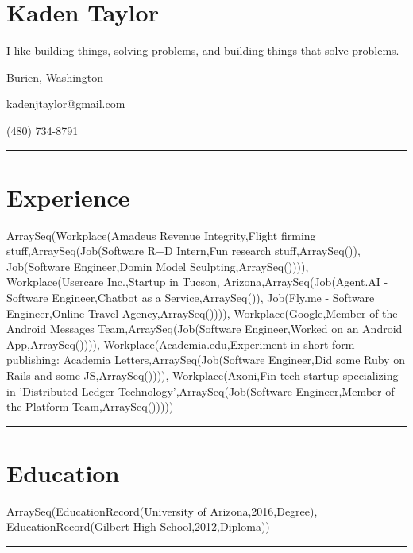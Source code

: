 \documentclass{article}
\begin{document}
\section*{Kaden Taylor}

I like building things, solving problems, and building things that solve problems.
\newline

Burien, Washington

kadenjtaylor@gmail.com

(480) 734-8791

\noindent\rule{\linewidth}{1pt}

\section*{Experience}

ArraySeq(Workplace(Amadeus Revenue Integrity,Flight firming stuff,ArraySeq(Job(Software R+D Intern,Fun research stuff,ArraySeq()), Job(Software Engineer,Domin Model Sculpting,ArraySeq()))), Workplace(Usercare Inc.,Startup in Tucson, Arizona,ArraySeq(Job(Agent.AI - Software Engineer,Chatbot as a Service,ArraySeq()), Job(Fly.me - Software Engineer,Online Travel Agency,ArraySeq()))), Workplace(Google,Member of the Android Messages Team,ArraySeq(Job(Software Engineer,Worked on an Android App,ArraySeq()))), Workplace(Academia.edu,Experiment in short-form publishing: Academia Letters,ArraySeq(Job(Software Engineer,Did some Ruby on Rails and some JS,ArraySeq()))), Workplace(Axoni,Fin-tech startup specializing in 'Distributed Ledger Technology',ArraySeq(Job(Software Engineer,Member of the Platform Team,ArraySeq()))))

\noindent\rule{\linewidth}{1pt}

\section*{Education}

ArraySeq(EducationRecord(University of Arizona,2016,Degree), EducationRecord(Gilbert High School,2012,Diploma))

\noindent\rule{\linewidth}{1pt}
\end{document}
